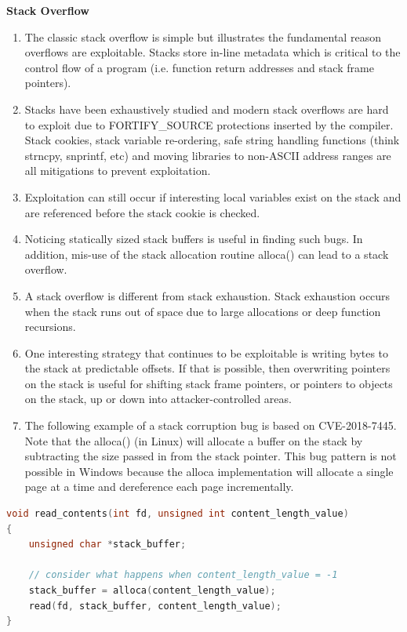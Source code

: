 \documentclass[12pt]{Training}
\begin{document}
\textbf{Stack Overflow}
\begin{enumerate}
	\item The classic stack overflow is simple but illustrates the fundamental reason overflows are exploitable. Stacks store in-line metadata which is critical to the control flow of a program (i.e. function return addresses and stack frame pointers).
	\item Stacks have been exhaustively studied and modern stack overflows are hard to exploit due to FORTIFY\_SOURCE protections inserted by the compiler. Stack cookies, stack variable re-ordering, safe string handling functions (think strncpy, snprintf, etc) and moving libraries to non-ASCII address ranges are all mitigations to prevent exploitation.
	\item Exploitation can still occur if interesting local variables exist on the stack and are referenced before the stack cookie is checked.
	\item Noticing statically sized stack buffers is useful in finding such bugs. In addition, mis-use of the stack allocation routine alloca() can lead to a stack overflow.
	\item A stack overflow is different from stack exhaustion. Stack exhaustion occurs when the stack runs out of space due to large allocations or deep function recursions.
	\item One interesting strategy that continues to be exploitable is writing bytes to the stack at predictable offsets. If that is possible, then overwriting pointers on the stack is useful for shifting stack frame pointers, or pointers to objects on the stack, up or down into attacker-controlled areas.
	\item The following example of a stack corruption bug is based on CVE-2018-7445. Note that the alloca() (in Linux) will allocate a buffer on the stack by subtracting the size passed in from the stack pointer. This bug pattern is not possible in Windows because the alloca implementation will allocate a single page at a time and dereference each page incrementally.
\end{enumerate}

\begin{sectionbox}
\begin{lstlisting}[language=C, caption={Stack Corruption}]
void read_contents(int fd, unsigned int content_length_value)
{
	unsigned char *stack_buffer;

	// consider what happens when content_length_value = -1
	stack_buffer = alloca(content_length_value);
	read(fd, stack_buffer, content_length_value);
}
\end{lstlisting}
\end{sectionbox}
\end{document}
